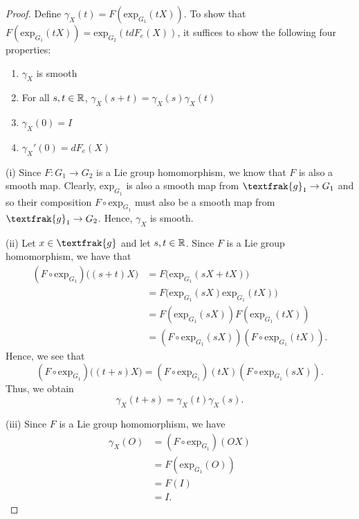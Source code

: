 \documentclass{article}
\begin{document}
\begin{proof}
    Define \( {\gamma}_{X}(t) = F(\text{exp}_{{G}_{1}}(tX)) \). To show that \( F(\text{exp}_{{G}_{1}}(tX) ) = \text{exp}_{{G}_{2}}(t d {F}_{e}(X))  \), it suffices to show the following four properties: 
    \begin{enumerate}
        \item[(i)] \( {\gamma}_{X}  \) is smooth 
        \item[(ii)] For all \( s,t \in \mathbb{R}  \), \( {\gamma}_{X}(s+t) = {\gamma}_{X}(s) {\gamma}_{X}(t) \)
        \item[(iii)] \( {\gamma}_{X}(0) = I  \)
        \item[(iv)] \( {\gamma}_{X}'(0) = d {F}_{e}(X) \)
    \end{enumerate}
    
    (i) Since \( F: {G}_{1} \to {G}_{2} \) is a Lie group homomorphism, we know that \( F  \) is also a smooth map. Clearly, \( \text{exp}_{{G}_{1}}  \) is also a smooth map from \( {\textfrak{g}}_{1} \to {G}_{1} \) and so their composition \( F \circ \text{exp}_{{G}_{1}}    \) must also be a smooth map from \( {\textfrak{g}}_{1} \to {G}_{2} \). Hence, \( {\gamma}_{X} \) is smooth.

    (ii) Let \( x \in \textfrak{g} \) and let \( s,t \in \mathbb{R}  \). Since \( F  \) is a Lie group homomorphism, we have that 
    \begin{align*}
        (F \circ \text{exp}_{{G}_{1}} )\Big(  (s+t) X  \Big) &= F\Big({\text{exp} }_{{G}_{1}}(sX + tX)\Big) \\
                                                             &= F\Big(\text{exp}_{{G}_{1}}(sX) {\text{exp}}_{{G}_{1}}(tX) \Big) \\
                                                             &= F({\text{exp}}_{{G}_{1}}(sX)) F({\text{exp}}_{{G}_{1}}(tX)) \\
                                                             &= (F \circ {\text{exp}}_{{G}_{1}}(sX)) (F \circ {\text{exp}}_{{G}_{1}}(tX)).
    \end{align*}
    Hence, we see that 
    \[ (F \circ {\text{exp}}_{{G}_{1}})\Big( (t+s)X \Big) = (F \circ {\text{exp}}_{{G}_{1}})(tX) (F \circ {\text{exp}}_{{G}_{1}}(sX)). \]
    Thus, we obtain
    \[  {\gamma}_{X}(t+s) = {\gamma}_{X}(t) {\gamma}_{X}(s). \]

    (iii) Since \( F  \) is a Lie group homomorphism, we have  
    \begin{align*}
        {\gamma}_{X}(O) &= (F \circ {\text{exp}}_{{G}_{1}})(OX) \\
                        &= F({\text{exp}}_{{G}_{1}}(O)) \\
                        &= F(I) \\
                        &= I. 
    \end{align*}


\end{proof}
\end{document}
